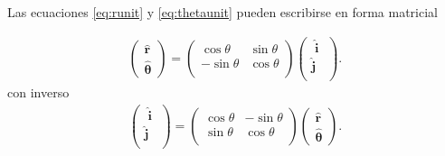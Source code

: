 Las ecuaciones \eqref{eq:runit} y \eqref{eq:thetaunit} pueden escribirse en forma matricial


\begin{align}
  \label{eq:polinv}
  \begin{pmatrix}
    \hat{\mathbf{r}}\\
    \hat{\boldsymbol{\theta}}
  \end{pmatrix}=
  \begin{pmatrix}
    \cos\theta&\sin\theta\\
    -\sin\theta&\cos\theta\\
  \end{pmatrix}
  \begin{pmatrix}
    \;\hat{\mathbf{i}}\;\\
    \hat{\mathbf{j}}\\
  \end{pmatrix}.
\end{align}
con inverso
\begin{align}
  \begin{pmatrix}
    \;\hat{\mathbf{i}}\;\\
    \hat{\mathbf{j}}\\
  \end{pmatrix}=
  \begin{pmatrix}
    \cos\theta&-\sin\theta\\
    \sin\theta&\cos\theta\\
  \end{pmatrix}
  \begin{pmatrix}
    \hat{\mathbf{r}}\\
    \hat{\boldsymbol{\theta}}
  \end{pmatrix}.
\end{align}

